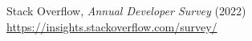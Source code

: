 \documentclass[licencjacka,en]{pracamgr}
\begin{document}
\begin{thebibliography}{99}







 Stack Overflow,
	\textit{Annual Developer Survey} (2022) \\
	\url{https://insights.stackoverflow.com/survey/}
















\end{thebibliography}
\end{document}
